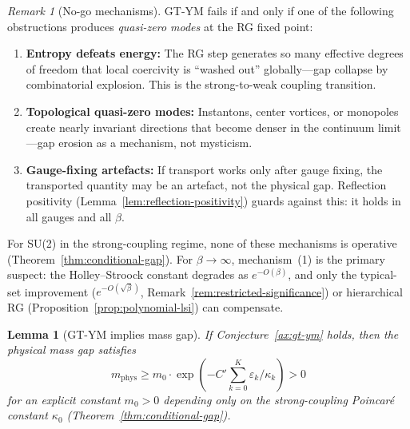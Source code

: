 \documentclass[12pt,a4paper]{article}
\theoremstyle{definition}
\theoremstyle{plain}
\newtheorem{lemma}[definition]{Lemma}
\theoremstyle{remark}
\newtheorem{remark}[definition]{Remark}
\begin{document}
\begin{remark}[No-go mechanisms]\label{rem:gt-nogo}
GT-YM fails if and only if one of the following obstructions produces \emph{quasi-zero modes} at the RG fixed point:
\begin{enumerate}
\item \textbf{Entropy defeats energy:} The RG step generates so many effective degrees of freedom that local coercivity is ``washed out'' globally---gap collapse by combinatorial explosion. This is the strong-to-weak coupling transition.
\item \textbf{Topological quasi-zero modes:} Instantons, center vortices, or monopoles create nearly invariant directions that become denser in the continuum limit---gap erosion as a mechanism, not mysticism.
\item \textbf{Gauge-fixing artefacts:} If transport works only after gauge fixing, the transported quantity may be an artefact, not the physical gap. Reflection positivity (Lemma~\ref{lem:reflection-positivity}) guards against this: it holds in all gauges and all $\beta$.
\end{enumerate}
For SU(2) in the strong-coupling regime, none of these mechanisms is operative (Theorem~\ref{thm:conditional-gap}). For $\beta \to \infty$, mechanism~(1) is the primary suspect: the Holley--Stroock constant degrades as $e^{-O(\beta)}$, and only the typical-set improvement ($e^{-O(\sqrt{\beta})}$, Remark~\ref{rem:restricted-significance}) or hierarchical RG (Proposition~\ref{prop:polynomial-lsi}) can compensate.
\end{remark}

\begin{lemma}[GT-YM implies mass gap]\label{lem:gt-massgap}
If Conjecture~\ref{ax:gt-ym} holds, then the physical mass gap satisfies
\begin{equation}
  m_{\mathrm{phys}} \geq m_0 \cdot \exp\!\left(-C' \sum_{k=0}^{K} \varepsilon_k / \kappa_k\right) > 0
\end{equation}
for an explicit constant $m_0 > 0$ depending only on the strong-coupling Poincar\'e constant $\kappa_0$ (Theorem~\ref{thm:conditional-gap}).
\end{lemma}

\end{document}
